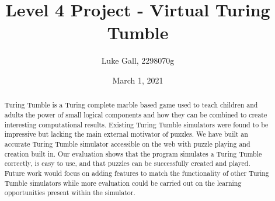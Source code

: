 \documentclass{l4proj}
\begin{document}
\title{Level 4 Project - Virtual Turing Tumble}
\author{Luke Gall, 2298070g}
\date{March 1, 2021}

\maketitle

\begin{abstract}
    Turing Tumble is a Turing complete marble based game used to teach children and adults the power of small logical components and how they can be combined to create interesting computational results. Existing Turing Tumble simulators were found to be impressive but lacking the main external motivator of puzzles. We have built an accurate Turing Tumble simulator accessible on the web with puzzle playing and creation built in. Our evaluation shows that the program simulates a Turing Tumble correctly, is easy to use, and that puzzles can be successfully created and played. Future work would focus on adding features to match the functionality of other Turing Tumble simulators while more evaluation could be carried out on the learning opportunities present within the simulator.
\end{abstract}


%
%
\def\consentname {Luke Gall} %
\def\consentdate {12 February 2021} %
%
\educationalconsent


\tableofcontents
\end{document}

